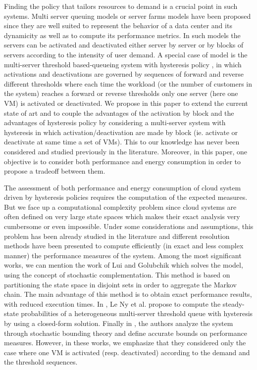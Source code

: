 \documentclass[conference]{IEEEtran}
\begin{document}
Finding the policy that tailors resources to demand is a crucial point in such systems.
Multi server queuing models \cite{Artalejo2005} or server farms models \cite{Gandhi2010,mitrani2013managing} have been proposed
since they are well suited to represent the behavior of a data center and its dynamicity as well as to compute its performance metrics.
In such models the servers can be activated and deactivated either   server by server or by blocks of servers  according to the intensity 
of user demand.
A special case of model is the multi-server threshold based-queueing system with hysteresis policy \cite{art:serfozo}, in which activations 
and deactivations are governed by sequences of forward and reverse different thresholds
where each time the workload (or the number of customers in the system) reaches a forward or reverse thresholds only one server (here one VM)
is activated or deactivated. We propose in this paper to extend the current state of art and
to couple the advantages of the activation by block and the advantages of hysteresis policy
by considering a multi-server system with hysteresis in which
activation/deactivation are made by block (ie. activate or deactivate at same time a set of VMs).
This to our knowledge has never been considered and studied previously in the literature. Moreover, in this paper, 
one objective is to consider both performance and energy consumption in order to propose a tradeoff between them. 

The assessment of both performance and  energy consumption of cloud system driven by hysteresis policies requires
the computation of the expected measures. But we face up a computational complexity problem since cloud systems are often defined
on very large state spaces which makes their exact analysis very cumbersome or even impossible.
Under some considerations and assumptions, this problem has been already studied in the literature
and different resolution methods have been presented to compute efficiently (in exact and less complex manner) the performance measures of the system.
Among the most significant works, we can mention the work of Lui and Golubchik \cite{lui1999stochastic} which
solves the model, using the concept of stochastic complementation. This method is based on partitioning the state space
in disjoint sets in order to aggregate the Markov chain.  The main advantage of this method is to obtain exact performance results, with reduced
execution times. In \cite{le2000simple}, Le Ny et al. propose to compute the steady-state probabilities of a heterogeneous multi-server threshold queue
with hysteresis by using a closed-form solution.  Finally in  \cite{ait2016mascots}, the authors analyze the system through stochastic
bounding theory and define accurate bounds on performance measures.
However, in these works, we emphasize that they considered only the case where one VM is activated (resp. deactivated)  according to
the demand and the threshold sequences.  
\end{document}
